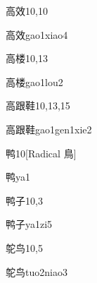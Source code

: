 \begin{entry}{高效}{10,10}
  \begin{phonetics}{高效}{gao1xiao4}
  \end{phonetics}
\end{entry}

\begin{entry}{高楼}{10,13}
  \begin{phonetics}{高楼}{gao1lou2}
  \end{phonetics}
\end{entry}

\begin{entry}{高跟鞋}{10,13,15}
  \begin{phonetics}{高跟鞋}{gao1gen1xie2}
  \end{phonetics}
\end{entry}

\begin{entry}{鸭}{10}[Radical 鳥]
  \begin{phonetics}{鸭}{ya1}
  \end{phonetics}
\end{entry}

\begin{entry}{鸭子}{10,3}
  \begin{phonetics}{鸭子}{ya1zi5}
  \end{phonetics}
\end{entry}

\begin{entry}{鸵鸟}{10,5}
  \begin{phonetics}{鸵鸟}{tuo2niao3}
  \end{phonetics}
\end{entry}



